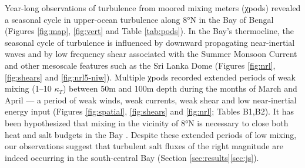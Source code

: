 \documentclass[onecol]{ametsoc}
\begin{document}
Year-long observations of turbulence from moored mixing meters (χpods) revealed a seasonal cycle in upper-ocean turbulence along 8°N in the Bay of Bengal (Figures \ref{fig:map}, \ref{fig:vert} and Table \ref{tab:pods}).
In the Bay's thermocline, the seasonal cycle of turbulence is influenced by downward propagating near-inertial waves and by low frequency shear associated with the Summer Monsoon Current and other mesoscale features such as the Sri Lanka Dome (Figures \ref{fig:nrl}, \ref{fig:shears} and \ref{fig:nrl5-niw}).
Multiple χpods recorded extended periods of weak mixing (1--10 \(κ_T\)) between 50m and 100m depth during the months of March and April --- a period of weak winds, weak currents, weak shear and low near-inertial energy input (Figures \ref{fig:spatial}, \ref{fig:shears} and \ref{fig:nrl}; Tables B1,B2).
It has been hypothesized that mixing in the vicinity of 8°N is necessary to close both heat and salt budgets in the Bay \citep{Shenoi2002,Vinayachandran2013,Wilson2016a}.
Despite these extended periods of low mixing, our observations suggest that turbulent salt fluxes of the right magnitude are indeed occurring in the south-central Bay (Section \ref{sec:results}\ref{sec:js}).
\end{document}
